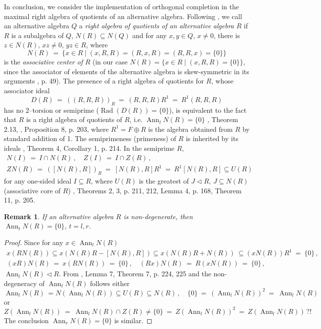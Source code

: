 \documentclass[a4paper,11pt]{article}
\newtheorem{rem}[defi]{Remark}
\DeclareMathOperator{\prr}{Rad}
\DeclareMathOperator{\Ann}{Ann}
\begin{document}
In conclusion, we consider the implementation of orthogonal completion in the 
maximal right algebra of quotients of an alternative algebra. Following \cite{MLQA}, we call 
an alternative algebra $Q$ a \emph{right algebra of quotients of an alternative 
algebra $R$} if $R$ is a subalgebra of $Q$, ${N(R)\subseteq N(Q)}$ and for 
any ${x, y\in Q}$, ${x\ne 0}$, there is ${z\in N(R)}$, ${x z\ne 0}$, 
${y z\in R}$, where  
\[
N(R)\ =\ \{x\in R\mid (x, R, R)=(R, x, R)=(R, R, x)=\{0\}\}
\] 
is the \emph{associative center of $R$} (in our case 
${N(R)=\{x\in R\mid (x, R, R)=\{0\}\}}$, since the associator of elements of 
the alternative algebra is skew-symmetric in its arguments 
\cite{ZShS}, p. 49). The presence of a right algebra of quotients for 
$R$, whose associator ideal  
\[
D(R)\ =\ ((R, R, R))_R\ =\ (R, R, R) R^1\ =\ R^1 (R, R, R)
\]
has no $2$--torsion or semiprime (${\prr(D(R))=\{0\}}$), is equivalent to the 
fact that $R$ is a right algebra of quotients of $R$, i.e. 
${\Ann_l N(R)=\{0\}}$ \cite{MLQA}, Theorem 2.13, \cite{ZShS}, 
Proposition 8, p. 203, where ${R^1=F\oplus R}$ is the algebra obtained from 
$R$ by standard addition of 1. The semiprimeness (primeness) of $R$ is 
inherited by its ideals \cite{ZShS}, Theorem 4, Corollary 1, p. 214. In 
the semiprime $R$, 
\begin{gather*}
N(I)\ =\ I\cap N(R)\,,\quad Z(I)\ =\ I\cap Z(R)\,,
\\
ZN(R)\ =\ ([N(R), R])_R\ =\ [N(R), R] R^1\ =\ R^1 [N(R), R]\subseteq U(R)
\end{gather*}
for any one-sided ideal ${I\subseteq R}$, where $U(R)$ is the 
greatest of ${J\lhd R}$, ${J\subseteq N(R)}$ (associative core of $R$) 
\cite{ZShS}, Theorems 2, 3, p. 211, 212, Lemma 4, p. 168, Theorem 11, p. 205. 

\begin{rem}
If an alternative algebra $R$ is non-degenerate, then ${\Ann_t N(R)=\{0\}}$, 
${t=l, r}$.  
\end{rem}

\begin{proof} 
Since for any ${x\in \Ann_l N(R)}$
\begin{gather*}
x (R N(R))\subseteq x (N(R) R-[N(R), R])\subseteq x (N(R) R+N(R))\
\subseteq (x N(R)) R^1\ =\ \{0\}\,,
\\
(x R) N(R)\ =\ x (R N(R))\ =\ \{0\}\,,\quad 
(R x) N(R)\ =\ R (x N(R))\ =\ \{0\}\,,
\end{gather*}
${\Ann_l N(R)\lhd R}$. From \cite{ZShS}, Lemma 7, Theorem 7, p. 224, 225 and 
the non-degeneracy of $\Ann_l N(R)$ follows either 
\[
\Ann_l N(R)\ = N(\Ann_l N(R))\subseteq U(R)\subseteq N(R)\,,\quad 
\{0\}\ =\ (\Ann_l N(R))^2\ =\ \Ann_l N(R)
\]
or
\[
Z(\Ann_l N(R))\ =\ \Ann_l N(R)\cap Z(R)\ne \{0\}\ =\ Z(\Ann_l N(R))^2\ =\ 
Z(\Ann_l N(R))\,?!
\]
The conclusion ${\Ann_r N(R)=\{0\}}$ is similar.
\end{proof}
\end{document}
